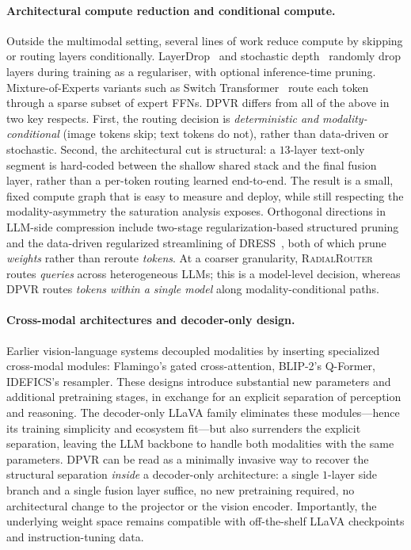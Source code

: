 \documentclass[a4paper,fleqn,review]{cas-sc}
\newcommand{\dpvr}{DPVR}
\begin{document}
\paragraph{Architectural compute reduction and conditional compute.}
Outside the multimodal setting, several lines of work reduce compute
by skipping or routing layers conditionally.
LayerDrop~\citep{fan2020layerdrop} and stochastic
depth~\citep{huang2016stochasticdepth} randomly drop layers during
training as a regulariser, with optional inference-time pruning.
Mixture-of-Experts variants such as Switch
Transformer~\citep{fedus2022switchtransformer} route each token
through a sparse subset of expert FFNs. \dpvr{} differs from all of
the above in two key respects. First, the routing decision is
\emph{deterministic and modality-conditional} (image tokens skip;
text tokens do not), rather than data-driven or stochastic. Second,
the architectural cut is structural: a $13$-layer text-only segment
is hard-coded between the shallow shared stack and the final fusion
layer, rather than a per-token routing learned end-to-end. The
result is a small, fixed compute graph that is easy to measure and
deploy, while still respecting the modality-asymmetry the saturation
analysis exposes.
Orthogonal directions in LLM-side compression include two-stage
regularization-based structured pruning~\citep{feng2025two} and the
data-driven regularized streamlining of \textsc{DRESS}~\citep{feng2025dress},
both of which prune \emph{weights} rather than reroute \emph{tokens}.
At a coarser granularity,
\textsc{RadialRouter}~\citep{jin2025radialrouter} routes \emph{queries}
across heterogeneous LLMs; this is a model-level decision, whereas
\dpvr{} routes \emph{tokens within a single model} along
modality-conditional paths.

\paragraph{Cross-modal architectures and decoder-only design.}
Earlier vision-language systems decoupled modalities by inserting
specialized cross-modal modules: Flamingo's gated cross-attention,
BLIP-2's Q-Former, IDEFICS's resampler. These designs introduce
substantial new parameters and additional pretraining stages, in
exchange for an explicit separation of perception and reasoning.
The decoder-only LLaVA family eliminates these modules---hence its
training simplicity and ecosystem fit---but also surrenders the
explicit separation, leaving the LLM backbone to handle both
modalities with the same parameters. \dpvr{} can be read as a
minimally invasive way to recover the structural separation
\emph{inside} a decoder-only architecture: a single $1$-layer side
branch and a single fusion layer suffice, no new pretraining
required, no architectural change to the projector or the vision
encoder. Importantly, the underlying weight space remains compatible
with off-the-shelf LLaVA checkpoints and instruction-tuning data.
\end{document}
